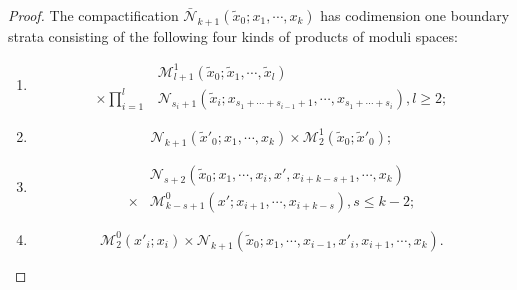 \documentclass{amsart}
\numberwithin{equation}{section}
\numberwithin{figure}{section}
\begin{document}
\begin{proof}
	The compactification $\bar{\mathcal{N}}_{k+1}(\tilde{x}_{0}; x_{1}, \cdots, x_{k})$ has codimension one boundary strata consisting of the following four kinds of products of moduli spaces:
\begin{enumerate}[label=(\roman*)] 

\item \begin{equation*}
\begin{split}
&\mathcal{M}_{l+1}^{1}(\tilde{x}_{0}; \tilde{x}_{1}, \cdots, \tilde{x}_{l})\\ \times \prod_{i=1}^{l} &\mathcal{N}_{s_{i}+1}(\tilde{x}_{i}; x_{s_{1} + \cdots + s_{i-1}+1}, \cdots, x_{s_{1} + \cdots + s_{i}}), l \ge 2;
\end{split}
\end{equation*}

\item \begin{equation*}
\mathcal{N}_{k+1}(\tilde{x}'_{0}; x_{1}, \cdots, x_{k}) \times \mathcal{M}_{2}^{1}(\tilde{x}_{0}; \tilde{x}'_{0});
\end{equation*}

\item \begin{equation*}
\begin{split}
&\mathcal{N}_{s+2}(\tilde{x}_{0}; x_{1}, \cdots, x_{i}, x', x_{i+k-s+1}, \cdots, x_{k})\\ \times &\mathcal{M}_{k-s+1}^{0}(x'; x_{i+1}, \cdots, x_{i+k-s}), s \le k - 2;
\end{split}
\end{equation*}

\item \begin{equation*}
\mathcal{M}_{2}^{0}(x'_{i}; x_{i}) \times \mathcal{N}_{k+1}(\tilde{x}_{0}; x_{1}, \cdots, x_{i-1}, x'_{i}, x_{i+1}, \cdots, x_{k}).
\end{equation*}


\end{enumerate}
\end{proof}
\end{document}
